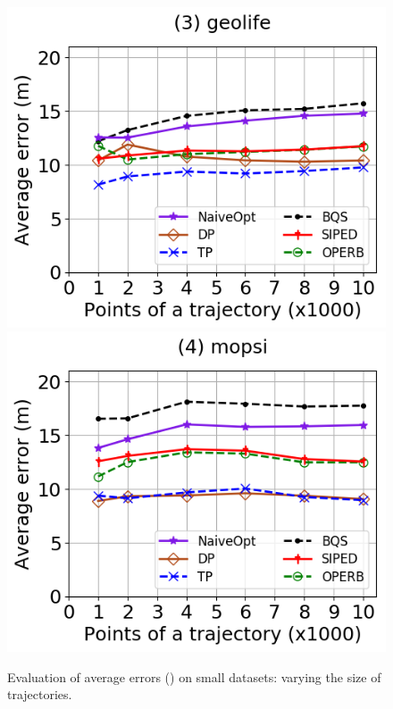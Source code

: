 \begin{figure}[tb!]
	\includegraphics[scale=0.315]{Figures/Exp-PED-error-size-geolife.png}	\hspace{1ex}
	\includegraphics[scale=0.315]{Figures/Exp-PED-error-size-mopsi.png}		
	\vspace{-3ex}
	\caption{\small Evaluation of average errors (\ped) on small datasets: varying the size of
    trajectories.}
  \label{fig:ae-ped-size}
	\vspace{-2ex}
\end{figure}

